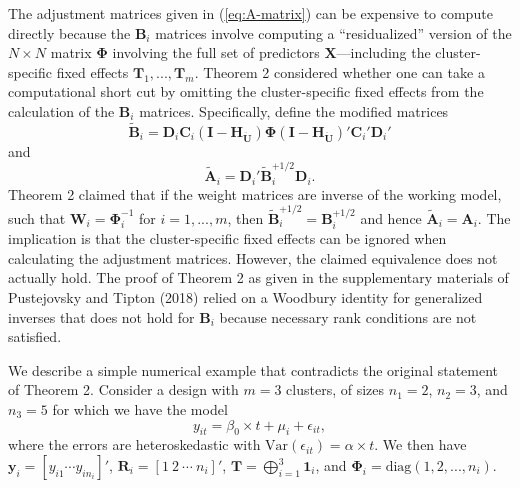 \documentclass[12pt]{article}
\begin{document}
The adjustment matrices given in (\ref{eq:A-matrix}) can be expensive to
compute directly because the \(\mathbf{B}_i\) matrices involve computing
a ``residualized'' version of the \(N \times N\) matrix
\(\boldsymbol\Phi\) involving the full set of predictors
\(\mathbf{X}\)---including the cluster-specific fixed effects
\(\mathbf{T}_1,...,\mathbf{T}_m\). Theorem 2 considered whether one can
take a computational short cut by omitting the cluster-specific fixed
effects from the calculation of the \(\mathbf{B}_i\) matrices.
Specifically, define the modified matrices \begin{equation}
\label{eq:B-modified}
\mathbf{\tilde{B}}_i = \mathbf{D}_i \mathbf{C}_i \left(\mathbf{I} - \mathbf{H}_{\mathbf{\ddot{U}}}\right) \boldsymbol\Phi \left(\mathbf{I} - \mathbf{H}_{\mathbf{\ddot{U}}}\right)'\mathbf{C}_i' \mathbf{D}_i'
\end{equation} and \begin{equation}
\label{eq:A-modified}
\mathbf{\tilde{A}}_i = \mathbf{D}_i' \mathbf{\tilde{B}}_i^{+1/2} \mathbf{D}_i.
\end{equation} Theorem 2 claimed that if the weight matrices are inverse
of the working model, such that
\(\mathbf{W}_i = \boldsymbol\Phi_i^{-1}\) for \(i = 1,...,m\), then
\(\mathbf{\tilde{B}}_i^{+1/2} = \mathbf{B}_i^{+1/2}\) and hence
\(\mathbf{\tilde{A}}_i = \mathbf{A}_i\). The implication is that the
cluster-specific fixed effects can be ignored when calculating the
adjustment matrices. However, the claimed equivalence does not actually
hold. The proof of Theorem 2 as given in the supplementary materials of
Pustejovsky and Tipton (2018) relied on a Woodbury identity for
generalized inverses that does not hold for \(\mathbf{B}_i\) because
necessary rank conditions are not satisfied.

We describe a simple numerical example that contradicts the original
statement of Theorem 2. Consider a design with \(m = 3\) clusters, of
sizes \(n_1 = 2\), \(n_2 = 3\), and \(n_3 = 5\) for which we have the
model \[
y_{it} = \beta_0 \times t + \mu_i + \epsilon_{it},
\] where the errors are heteroskedastic with
\(\text{Var}(\epsilon_{it}) = \alpha \times t\). We then have
\(\mathbf{y}_i = \left[ y_{i1} \cdots y_{in_i}\right]'\),
\(\mathbf{R}_i = \left[1 \ 2 \ \cdots \ n_i\right]'\),
\(\mathbf{T} = \bigoplus_{i=1}^3 \mathbf{1}_i\), and
\(\boldsymbol\Phi_i = \text{diag}(1,2,...,n_i)\).
\end{document}
